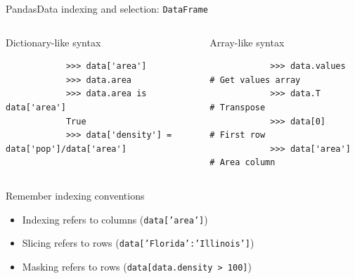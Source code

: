 \documentclass[10pt,compress]{beamer} %
\begin{document}
\begin{frame}[fragile]{Pandas}{Data indexing and selection: \texttt{DataFrame}}
	\begin{columns}
		\begin{exampleblock}{Dictionary-like syntax}
		\vspace{-0.2cm} 
			\begin{lstlisting}
			>>> data['area']
			>>> data.area
			>>> data.area is data['area']
			True
			>>> data['density'] = data['pop']/data['area']
			\end{lstlisting}
			\vspace{-0.2cm} 
		\end{exampleblock}

		\begin{exampleblock}{Array-like syntax}
		\vspace{-0.2cm} 
			\begin{lstlisting}
			>>> data.values # Get values array
			>>> data.T # Transpose
			>>> data[0] # First row
			>>> data['area'] # Area column
			\end{lstlisting}
			\vspace{-0.2cm} 
		\end{exampleblock}
	\end{columns}

	\bigskip

	Remember indexing conventions
	\begin{itemize}
		\item Indexing refers to columns (\texttt{data['area']})
		\item Slicing refers to rows (\texttt{data['Florida':'Illinois']})
		\item Masking refers to rows (\texttt{data[data.density > 100]})
	\end{itemize}
\end{frame}
\end{document}
